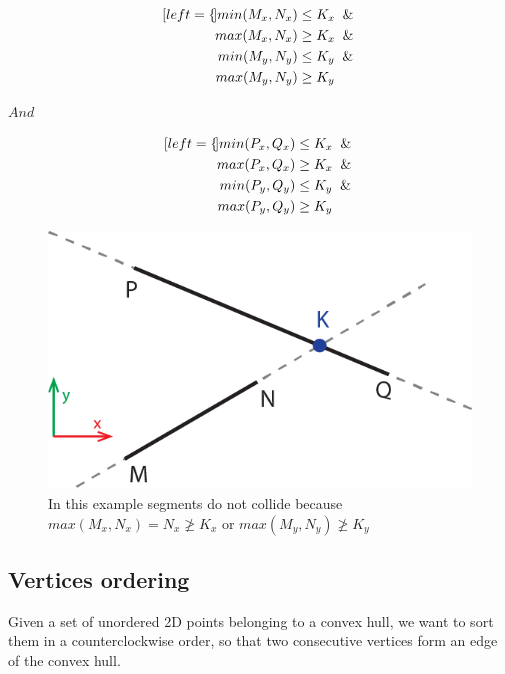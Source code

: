 \documentclass{PoliMi_MasterThesis}
\begin{document}
\begin{minipage}{.4\linewidth}
	\begin{subequations}
		\begin{align*}[left=\empheqlbrace]
			min(M_x, N_x) &\leq K_x \And\\
			max(M_x, N_x) &\geq K_x \And\\
			min(M_y, N_y) &\leq K_y \And\\
			max(M_y, N_y) &\geq K_y		
		\end{align*}
	\end{subequations}
\end{minipage}
		$And$
\begin{minipage}{.4\linewidth}
	\begin{subequations}
		\begin{align*}[left=\empheqlbrace]
			min(P_x, Q_x) &\leq K_x \And\\
			max(P_x, Q_x) &\geq K_x \And\\
			min(P_y, Q_y) &\leq K_y \And\\
			max(P_y, Q_y) &\geq K_y		
		\end{align*}
	\end{subequations}
\end{minipage}

\begin{figure}[H]
    \centering
    \includegraphics[width=\textwidth*\real{0.6}]{Images/segments_intersection.png} 
    \caption{In this example segments do not collide because $max(M_x, N_x) = N_x \ngeq K_x$ or $max(M_y, N_y) \ngeq K_y$}
    \label{fig:segments_intersection}
\end{figure}

\subsection{Vertices ordering}
Given a set of unordered 2D points belonging to a convex hull, we want to sort them in a counterclockwise order, so that two consecutive vertices form an edge of the convex hull.
\end{document}
